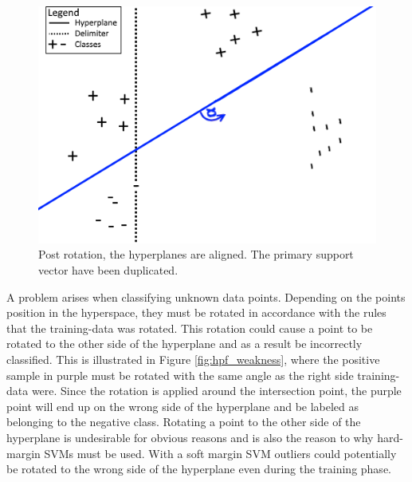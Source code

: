 \documentclass[a4paper,twoside]{bth}
\begin{document}
\begin{figure}
\centering
\includegraphics[scale=1]{images/intro-images/hyperplaneExplanation2.png}
   \caption{Post rotation, the hyperplanes are aligned. The primary support vector have been duplicated.}
   \label{fig:hpf_post_rotation}
\end{figure}

\par A problem arises when classifying unknown data points. Depending on the points position in the hyperspace, they must be rotated in accordance with the rules that the training-data was rotated. This rotation could cause a point to be rotated to the other side of the hyperplane and as a result be incorrectly classified. This is illustrated in Figure \ref{fig:hpf_weakness}, where the positive sample in purple must be rotated with the same angle as the right side training-data were. Since the rotation is applied around the intersection point, the purple point will end up on the wrong side of the hyperplane and be labeled as belonging to the negative class.
Rotating a point to the other side of the hyperplane is undesirable for obvious reasons and is also the reason to why hard-margin SVMs must be used. With a soft margin SVM outliers could potentially be rotated to the wrong side of the hyperplane even during the training phase.
\end{document}

